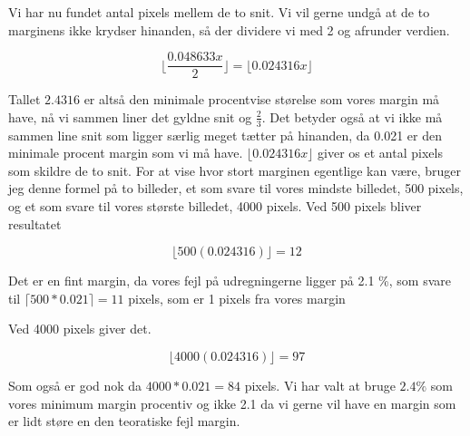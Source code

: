 Vi har nu fundet antal pixels mellem de to snit. Vi vil gerne undgå at
de to marginens ikke krydser hinanden, så der dividere vi med 2 og
afrunder verdien.

\begin{equation}
	\lfloor \frac{0.048633x}{2}\rfloor = \lfloor0.024316x \rfloor
\end{equation}

Tallet $2.4316$ er altså den minimale procentvise størelse som vores
margin må have, nå vi sammen liner det gyldne snit og $\frac{2}{3}$.
Det betyder også at vi ikke må sammen line snit som ligger særlig
meget tætter på hinanden, da 0.021 er den minimale procent margin som vi må have.
$\lfloor 0.024316x \rfloor$ giver os et antal pixels som skildre de to snit. For at vise
hvor stort marginen egentlige kan være, bruger jeg denne formel på to
billeder, et som svare til vores mindste billedet, 500 pixels, og et
som svare til vores største billedet, 4000 pixels. Ved 500 pixels
bliver resultatet

\begin{equation}
	 \lfloor 500(0.024316)\rfloor = 12
\end{equation}

Det er en fint margin, da vores fejl på udregningerne ligger på 2.1 \%,
som svare til $\lceil 500*0.021 \rceil = 11$ pixels, som er 1 pixels fra vores
margin

Ved 4000 pixels giver det.

\begin{equation}
	 \lfloor 4000(0.024316)\rfloor = 97
\end{equation}

Som også er god nok da $4000*0.021 = 84$ pixels. Vi har valt at bruge
$2.4\%$ som vores minimum margin procentiv og ikke 2.1 da vi gerne
vil have en margin som er lidt støre en den teoratiske fejl margin.
\label{margin}
